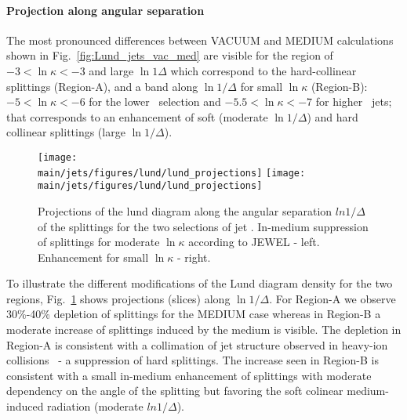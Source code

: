 \paragraph{Projection along angular separation}
The most pronounced differences between VACUUM and MEDIUM calculations shown in Fig.~\ref{fig:Lund_jets_vac_med} are visible for the region of $-3 < \ln \kappa < -3$ and large $\ln 1\Delta$ which correspond to the hard-collinear splittings (Region-A), and a band along $\ln 1/\Delta$ for small $\ln \kappa$ (Region-B): $-5 < \ln \kappa < -6$ for the lower \pt\ selection and $-5.5 < \ln \kappa < -7$ for higher \pt\ jets; that corresponds to an enhancement of soft (moderate $\ln 1/\Delta$) and hard collinear splittings (large $\ln 1/\Delta$).

\begin{figure}[htbp]
	\centering
	\texttt{[image: \\main/jets/figures/lund/lund\_projections]}
	\texttt{[image: \\main/jets/figures/lund/lund\_projections]}
	\caption{Projections of the lund diagram along the angular separation $ln 1/\Delta$ of the splittings for the two selections of jet \pt. In-medium suppression of splittings for moderate $\ln{\kappa}$ according to JEWEL - left. Enhancement for small $\ln{\kappa}$ - right.}
	\label{fig:Lund_projections}
\end{figure}

To illustrate the different modifications of the Lund diagram density for the two regions, Fig.~\ref{fig:Lund_projections} shows projections (slices) along $\ln 1/\Delta$. For Region-A we observe 30\%-40\% depletion of splittings for the MEDIUM case whereas in Region-B a moderate increase of splittings induced by the medium is visible. The depletion in Region-A is consistent with a collimation of jet structure observed in heavy-ion collisions~\cite{Acharya:2018uvf,Sirunyan:2018jqr} - a suppression of hard splittings. The increase seen in Region-B is consistent with a small in-medium enhancement of splittings with moderate dependency on the angle of the splitting but favoring the soft colinear medium-induced radiation (moderate $ln 1/\Delta$).

%

